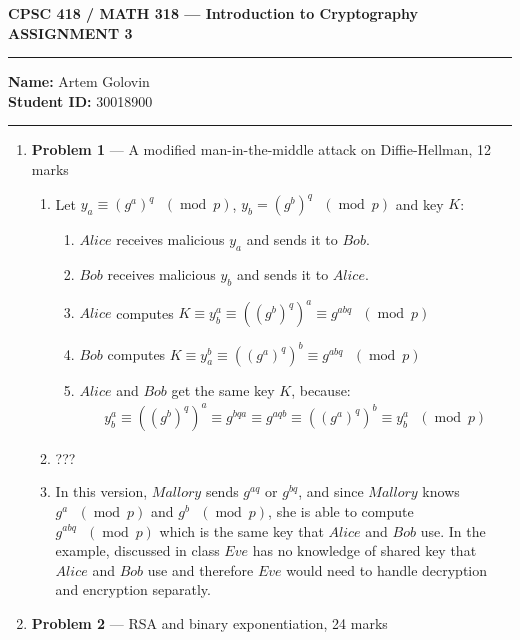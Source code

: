 \documentclass[11pt]{article}
\theoremstyle{definition}
\renewcommand{\pmod}[1]{\mbox{\ $(\ensuremath{\operatorname{mod}}\ {#1})$}}
\newcommand{\A}{Alice}
\newcommand{\B}{Bob}
\newcommand{\E}{Eve}
\newcommand{\M}{Mallory}
\begin{document}
\begin{center}
  \bf \Large CPSC 418 / MATH 318 --- Introduction to Cryptography \\
  ASSIGNMENT 3
\end{center}

\medskip \hrule
  \textbf{Name:} Artem Golovin \\
  \textbf{Student ID:} 30018900
\medskip \hrule


\begin{enumerate} \itemsep 0.3in

\item[] \textbf{Problem 1} --- A modified man-in-the-middle attack on Diffie-Hellman, 12 marks

\begin{enumerate}
  \item
    Let $y_a \equiv (g^a)^q \pmod{p}$, $y_b = (g^b)^q \pmod{p}$ and key $K$:
    \begin{enumerate}
      \item $\A$ receives malicious $y_a$ and sends it to $\B$.
      \item $\B$ receives malicious $y_b$ and sends it to $\A$.
      \item $\A$ computes $K \equiv y_b^a \equiv ((g^b)^q)^a \equiv g^{abq} \pmod{p}$
      \item $\B$ computes $K \equiv y_a^b \equiv ((g^a)^q)^b \equiv g^{abq} \pmod{p}$
      \item $\A$ and $\B$ get the same key $K$, because:
        \begin{align*}
          y_b^a \equiv ((g^b)^q)^a \equiv g^{bqa} \equiv g^{aqb} \equiv ((g^a)^q)^b \equiv y_b^a \pmod{p}
        \end{align*}
    \end{enumerate}
  \item ???
  \item
    In this version, $\M$ sends $g^{aq}$ or $g^{bq}$, and since $\M$ knows $g^{a} \pmod{p}$ and $g^{b} \pmod{p}$, she is able to compute $g^{abq} \pmod{p}$ which is the same key that $\A$ and $\B$ use. In the example, discussed in class $\E$  has no knowledge of shared key that $\A$ and $\B$ use and therefore $\E$ would need to handle decryption and encryption separatly.
\end{enumerate}

\newpage

\item[] \textbf{Problem 2} --- RSA and binary exponentiation, 24 marks


\end{enumerate}
\end{document}

